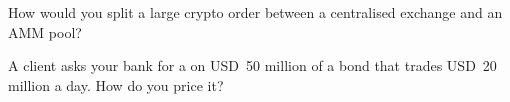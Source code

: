 \begin{interviewq}\label{iq:mx:execution-beyond-equities:5}
How would you split a large crypto order between a centralised exchange and an AMM pool?
\end{interviewq}

\begin{interviewq}\label{iq:mx:execution-beyond-equities:6}
A client asks your bank for a  on USD~50 million of a bond that trades USD~20 million a day. How do you price it?
\end{interviewq}
